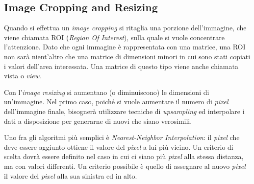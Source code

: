 % 
% 
% 
% 

\clearpage
\subsection {Image Cropping and Resizing}
Quando si effettua un \textit{image cropping} si ritaglia una porzione dell'immagine, che viene chiamata ROI (\textit{Region Of Interest}), sulla quale si vuole concentrare l'attenzione.
Dato che ogni immagine è rappresentata con una matrice, una ROI non sarà nient'altro che una matrice di dimensioni minori in cui sono stati copiati i valori dell'area interessata.
Una matrice di questo tipo viene anche chiamata vista o \textit{view}.

Con l'\textit{image resizing} si aumentano (o diminuiscono) le dimensioni di un'immagine.
Nel primo caso, poiché si vuole aumentare il numero di \textit{pixel} dell'immagine finale, bisognerà utilizzare tecniche di \textit{upsampling} ed interpolare i dati a disposizione per generarne di nuovi che siano verosimili.

Uno fra gli algoritmi più semplici è \textit{Nearest-Neighbor Interpolation}:
il \textit{pixel} che deve essere aggiunto ottiene il valore del \textit{pixel} a lui più vicino.
Un criterio di scelta dovrà essere definito nel caso in cui ci siano più \textit{pixel} alla stessa distanza, ma con valori differenti.
Un criterio possibile è quello di assegnare al nuovo \textit{pixel} il valore del \textit{pixel} alla sua sinistra ed in alto.

